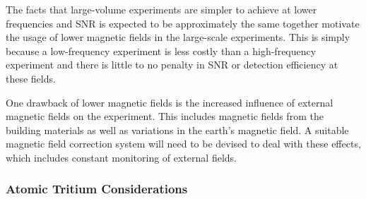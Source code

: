 The facts that large-volume experiments are simpler to achieve at lower frequencies and SNR is expected to be approximately the same together motivate the usage of lower magnetic fields in the large-scale experiments. This is simply because a low-frequency experiment is less costly than a high-frequency experiment and there is little to no penalty in SNR or detection efficiency at these fields.

One drawback of lower magnetic fields is the increased influence of external magnetic fields on the experiment. This includes magnetic fields from the building materials as well as variations in the earth's magnetic field. A suitable magnetic field correction system will need to be devised to deal with these effects, which includes constant monitoring of external fields.

\subsubsection*{Atomic Tritium Considerations}

